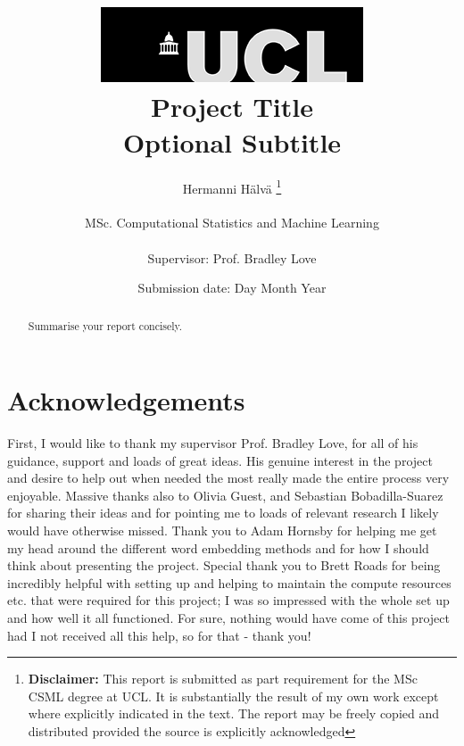 \documentclass[12pt]{report}
\title{  	{ \includegraphics[scale=.5]{ucl_logo.png}}\\
{{\Huge Project Title}}\\
{\large Optional Subtitle}\\
		}
\date{Submission date: Day Month Year}
\author{Hermanni H{\"a}lv{\"a} \thanks{
{\bf Disclaimer:}
This report is submitted as part requirement for the MSc CSML degree at UCL. It is
substantially the result of my own work except where explicitly indicated in the text.
The report may be freely copied and distributed provided the source is explicitly acknowledged
\newline  %
}
\\ \\
MSc. Computational Statistics and Machine Learning\\ \\
Supervisor: Prof. Bradley Love}
\begin{document}
 
\onehalfspacing
\maketitle
\begin{abstract}
Summarise your report concisely.
\end{abstract}
\chapter*{Acknowledgements}
\thispagestyle{empty}
First, I would like to thank my supervisor Prof. Bradley Love, for all of his guidance, support and loads of great ideas. His genuine interest in the project and desire to help out when needed the most really made the entire process very enjoyable. Massive thanks also to Olivia Guest, and Sebastian Bobadilla-Suarez for sharing their ideas and for pointing me to loads of relevant research I likely would have otherwise missed. Thank you to Adam Hornsby for helping me get my head around the different word embedding methods and for how I should think about presenting the project. Special thank you to Brett Roads for being incredibly helpful with setting up and helping to maintain the compute resources etc. that were required for this project; I was so impressed with the whole set up and how well it all functioned. For sure, nothing would have come of this project had I not received all this help, so for that - thank you!

\clearpage

\tableofcontents
\listoffigures
\listoftables
\setcounter{page}{1}
\end{document}
